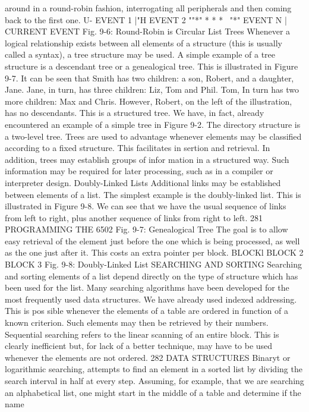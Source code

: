 {around in a round-robin fashion, interrogating all peripherals and
then coming back to the first one.
U- EVENT 1 |"H EVENT 2 ""*" * * * ~"*" EVENT N |
CURRENT EVENT
Fig. 9-6: Round-Robin is Circular List
Trees
Whenever a logical relationship exists between all elements of a
structure (this is usually called a syntax), a tree structure may be
used. A simple example of a tree structure is a descendant tree or a
genealogical tree. This is illustrated in Figure 9-7. It can be seen
that Smith has two children: a son, Robert, and a daughter, Jane.
Jane, in turn, has three children: Liz, Tom and Phil. Tom, In turn
has two more children: Max and Chris. However, Robert, on the
left of the illustration, has no descendants.
This is a structured tree. We have, in fact, already encountered
an example of a simple tree in Figure 9-2. The directory structure
is a two-level tree. Trees are used to advantage whenever elements
may be classified according to a fixed structure. This facilitates in
sertion and retrieval. In addition, trees may establish groups of infor
mation in a structured way. Such information may be required for later
processing, such as in a compiler or interpreter design.
Doubly-Linked Lists
Additional links may be established between elements of a list.
The simplest example is the doubly-linked list. This is illustrated
in Figure 9-8. We can see that we have the usual sequence of links
from left to right, plus another sequence of links from right to left.
281
PROGRAMMING THE 6502
Fig. 9-7: Genealogical Tree
The goal is to allow easy retrieval of the element just before the
one which is being processed, as well as the one just after it. This costs
an extra pointer per block.
BLOCKl BLOCK 2 BLOCK 3
Fig. 9-8: Doubly-Linked List
SEARCHING AND SORTING
Searching and sorting elements of a list depend directly on the
type of structure which has been used for the list. Many searching
algorithms have been developed for the most frequently used data
structures. We have already used indexed addressing. This is pos
sible whenever the elements of a table are ordered in function of a
known criterion. Such elements may then be retrieved by their
numbers.
Sequential searching refers to the linear scanning of an entire
block. This is clearly inefficient but, for lack of a better technique, may
have to be used whenever the elements are not ordered.
282
DATA STRUCTURES
Binaryt or logarithmic searching, attempts to find an element in a
sorted list by dividing the search interval in half at every step.
Assuming, for example, that we are searching an alphabetical list,
one might start in the middle of a table and determine if the name
}
